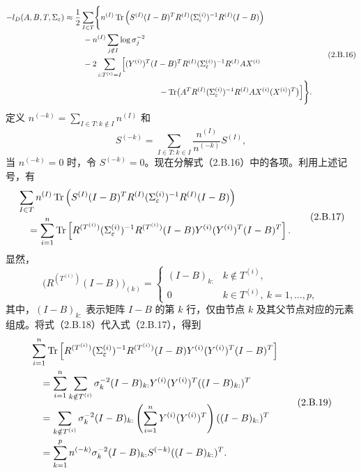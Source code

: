 \begin{equation}
\begin{aligned}
-l_D(A,B,T,\Sigma_\varepsilon)
 \approx{}&\frac12\sum_{I\in T}\Biggl\{
 n^{(I)}\Tr\left(S^{(I)}(I-B)^TR^{(I)}
  (\Sigma_\varepsilon^{(i)})^{-1}R^{(I)}(I-B)\right)\\
 &\quad-n^{(I)}\sum_{j\notin I}\log\sigma_j^{-2}\\
 &\quad-2\sum_{i:T^{(i)}=I}\Bigl[
 (Y^{(i)})^T(I-B)^TR^{(I)}
 (\Sigma_\varepsilon^{(i)})^{-1}R^{(I)}AX^{(i)}\\
 &\hspace{3.7cm}
 -\Tr\bigl(A^TR^{(I)}(\Sigma_\varepsilon^{(i)})^{-1}
 R^{(I)}AX^{(i)}(X^{(i)})^T\bigr)\Bigr]\Biggr\}.
\end{aligned}\tag{2.B.16}
\end{equation}
定义 $n^{(-k)}=\sum_{I\in T:k\notin I}n^{(I)}$ 和
\[
S^{(-k)}=\sum_{I\in T:k\in I}\frac{n^{(I)}}{n^{(-k)}}S^{(I)},
\]
当 $n^{(-k)}=0$ 时，令 $S^{(-k)}=0$。现在分解式（2.B.16）中的各项。利用上述记号，有
\begin{equation}
\begin{aligned}
&\sum_{I\in T}n^{(I)}\operatorname{Tr}\left(
 S^{(I)}(I-B)^TR^{(I)}
 (\Sigma_\varepsilon^{(i)})^{-1}R^{(I)}(I-B)\right)\\
&\quad=\sum_{i=1}^n\operatorname{Tr}\left[
 R^{(T^{(i)})}(\Sigma_\varepsilon^{(i)})^{-1}R^{(T^{(i)})}
 (I-B)Y^{(i)}(Y^{(i)})^T(I-B)^T\right].
\end{aligned}\tag{2.B.17}
\end{equation}
显然，
\begin{equation}
\bigl(R^{(T^{(i)})}(I-B)\bigr)_{(k)}=
\begin{cases}
(I-B)_{k:}&k\notin T^{(i)},\\
0&k\in T^{(i)},\ k=1,\ldots,p,
\end{cases}\tag{2.B.18}
\end{equation}
其中，$(I-B)_{k:}$ 表示矩阵 $I-B$ 的第 $k$ 行，仅由节点 $k$ 及其父节点对应的元素组成。将式（2.B.18）代入式（2.B.17），得到
\begin{equation}
\begin{aligned}
&\sum_{i=1}^n\operatorname{Tr}\left[
 R^{(T^{(i)})}(\Sigma_\varepsilon^{(i)})^{-1}R^{(T^{(i)})}
 (I-B)Y^{(i)}(Y^{(i)})^T(I-B)^T\right]\\
&\quad=\sum_{i=1}^n\sum_{k\notin T^{(i)}}\sigma_k^{-2}
 (I-B)_{k:}Y^{(i)}(Y^{(i)})^T((I-B)_{k:})^T\\
&\quad=\sum_{k\notin T^{(i)}}\sigma_k^{-2}(I-B)_{k:}
 \left(\sum_{i=1}^nY^{(i)}(Y^{(i)})^T\right)((I-B)_{k:})^T\\
&\quad=\sum_{k=1}^pn^{(-k)}\sigma_k^{-2}
 (I-B)_{k:}S^{(-k)}((I-B)_{k:})^T.
\end{aligned}\tag{2.B.19}
\end{equation}

